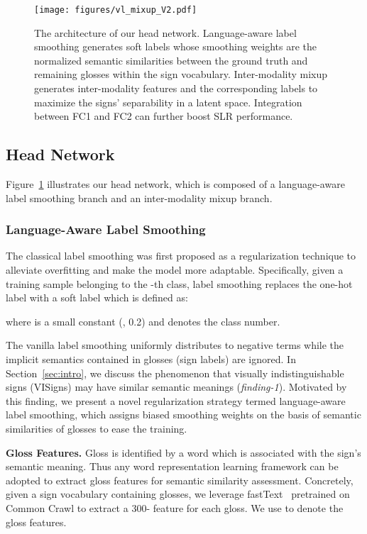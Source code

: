 \documentclass[10pt,twocolumn,letterpaper]{article}
\begin{document}
\begin{figure}[t]
\centering
\texttt{[image: figures/vl\_mixup\_V2.pdf]}
\vspace{-7mm}
\caption{
The architecture of our head network. Language-aware label smoothing generates soft labels whose smoothing weights are the normalized semantic similarities between the ground truth and remaining glosses within the sign vocabulary. Inter-modality mixup generates inter-modality features and the corresponding labels to maximize the signs' separability in a latent space.
Integration between FC1 and FC2 can further boost SLR performance.
}
\vspace{-5mm}
\label{fig:vl_mixup}
\end{figure}


\subsection{Head Network}
\label{sec:head}
Figure~\ref{fig:vl_mixup} illustrates our head network, which is composed of a language-aware label smoothing branch and an inter-modality mixup branch.

\vspace{-4mm}
\subsubsection{Language-Aware Label Smoothing}
\vspace{-2mm}
\label{sec:lang_lbsm}
The classical label smoothing \cite{szegedy2016rethinking, he2019bag} was first proposed as a regularization technique to alleviate overfitting and make the model more adaptable.
Specifically, given a training sample belonging to the -th class, label smoothing replaces the one-hot label with a soft label  which is defined as:

where  is a small constant (\eg, 0.2) and  denotes the class number.

The vanilla label smoothing uniformly distributes  to  negative terms while the implicit semantics contained in glosses (sign labels) are ignored. In Section~\ref{sec:intro}, we discuss the phenomenon that visually indistinguishable signs (VISigns) may have similar semantic meanings (\textit{finding-1}). Motivated by this finding, we present a novel regularization strategy termed language-aware label smoothing, which assigns biased smoothing weights on the basis of semantic similarities of glosses to ease the training.

\noindent\textbf{Gloss Features.} Gloss is identified by a word which is associated with the sign’s semantic meaning. Thus any word representation learning framework can be adopted to extract gloss features for semantic similarity assessment. Concretely, given a sign vocabulary containing  glosses, we leverage fastText~\cite{mikolov2018advances} pretrained on Common Crawl to extract a 300- feature for each gloss. We use  to denote the  gloss features.
\end{document}
